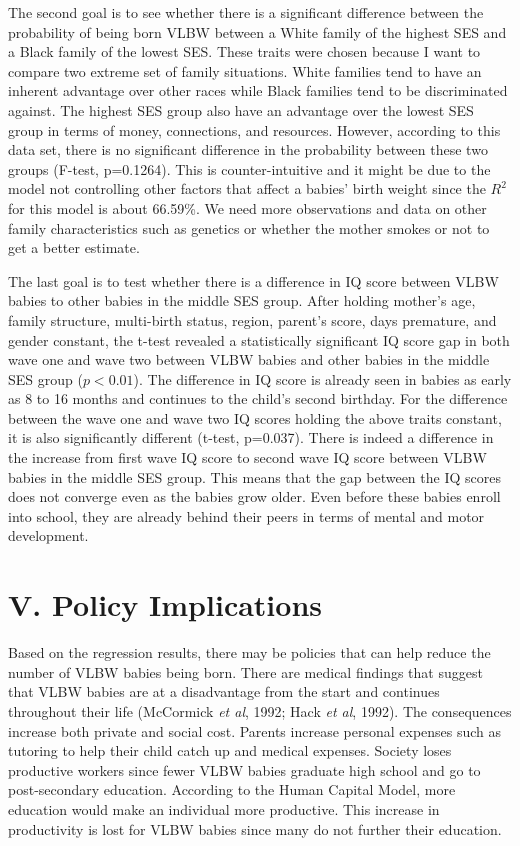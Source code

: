 \documentclass{article}
\begin{document}
The second goal is to see whether there is a significant difference between the probability of being born VLBW between a White family of the highest SES and a Black family of the lowest SES. These traits were chosen because I want to compare two extreme set of family situations. White families tend to have an inherent advantage over other races while Black families tend to be discriminated against. The highest SES group also have an advantage over the lowest SES group in terms of money, connections, and resources. However, according to this data set, there is no significant difference in the probability between these two groups (F-test, p=0.1264). This is counter-intuitive and it might be due to the model not controlling other factors that affect a babies' birth weight since the $R^2$ for this model is about 66.59\%. We need more observations and data on other family characteristics such as genetics or whether the mother smokes or not to get a better estimate.  


The last goal is to test whether there is a difference in IQ score between VLBW babies to other babies in the middle SES group. After holding mother's age, family structure, multi-birth status, region, parent's score, days premature, and gender constant, the t-test revealed a statistically significant IQ score gap in both wave one and wave two between VLBW babies and other babies in the middle SES group ($p < 0.01 $). The difference in IQ score is already seen in babies as early as 8 to 16 months and continues to the child's second birthday. For the difference between the wave one and wave two IQ scores holding the above traits constant, it is also significantly different (t-test, p=0.037). There is indeed a difference in the increase from first wave IQ score to second wave IQ score between VLBW babies in the middle SES group. This means that the gap between the IQ scores does not converge even as the babies grow older. Even before these babies enroll into school, they are already behind their peers in terms of mental and motor development.

\section*{V. Policy Implications}

Based on the regression results, there may be policies that can help reduce the number of VLBW babies being born. There are medical findings that suggest that VLBW babies are at a disadvantage from the start and continues throughout their life (McCormick \textit{et al}, 1992; Hack \textit{et al}, 1992). The consequences increase both private and social cost. Parents increase personal expenses such as tutoring to help their child catch up and medical expenses. Society loses productive workers since fewer VLBW babies graduate high school and go to post-secondary education. According to the Human Capital Model, more education would make an individual more productive. This increase in productivity is lost for VLBW babies since many do not further their education.   
\end{document}
